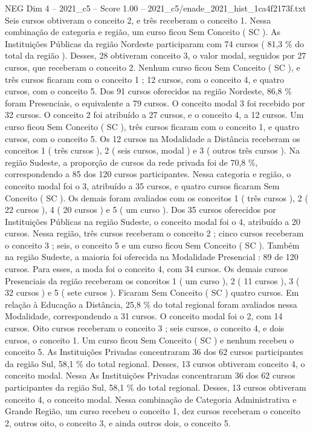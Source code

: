 \begin{textsample}{NEG Dim 4 – 2021\_c5 – Score 1.00 – 2021\_c5/enade\_2021\_hist\_1ca4f2173f.txt}
Seis cursos obtiveram o conceito 2, e três receberam o conceito 1.
Nessa combinação de categoria e região, um curso ficou Sem Conceito ( SC ).
As Instituições Públicas da região Nordeste participaram com 74 cursos ( 81,3 \% do total da região ).
Desses, 28 obtiveram conceito 3, o valor modal, seguidos por 27 cursos, que receberam o conceito 2.
Nenhum curso ficou Sem Conceito ( SC ), e três cursos ficaram com o conceito 1 ; 12 cursos, com o conceito 4, e quatro cursos, com o conceito 5.
Dos 91 cursos oferecidos na região Nordeste, 86,8 \% foram Presenciais, o equivalente a 79 cursos.
O conceito modal 3 foi recebido por 32 cursos.
O conceito 2 foi atribuído a 27 cursos, e o conceito 4, a 12 cursos.
Um curso ficou Sem Conceito ( SC ), três cursos ficaram com o conceito 1, e quatro cursos, com o conceito 5.
Os 12 cursos na Modalidade a Distância receberam os conceitos 1 ( três cursos ), 2 ( seis cursos, modal ) e 3 ( outros três cursos ).
Na região Sudeste, a proporção de cursos da rede privada foi de 70,8 \%, correspondendo a 85 dos 120 cursos participantes.
Nessa categoria e região, o conceito modal foi o 3, atribuído a 35 cursos, e quatro cursos ficaram Sem Conceito ( SC ).
Os demais foram avaliados com os conceitos 1 ( três cursos ), 2 ( 22 cursos ), 4 ( 20 cursos ) e 5 ( um curso ).
Dos 35 cursos oferecidos por Instituições Públicas na região Sudeste, o conceito modal foi o 4, atribuído a 20 cursos.
Nessa região, três cursos receberam o conceito 2 ; cinco cursos receberam o conceito 3 ; seis, o conceito 5 e um curso ficou Sem Conceito ( SC ).
Também na região Sudeste, a maioria foi oferecida na Modalidade Presencial : 89 de 120 cursos.
Para esses, a moda foi o conceito 4, com 34 cursos.
Os demais cursos Presenciais da região receberam os conceitos 1 ( um curso ), 2 ( 11 cursos ), 3 ( 32 cursos ) e 5 ( sete cursos ).
Ficaram Sem Conceito ( SC ) quatro cursos.
Em relação à Educação a Distância, 25,8 \% do total regional foram avaliados nessa Modalidade, correspondendo a 31 cursos.
O conceito modal foi o 2, com 14 cursos.
Oito cursos receberam o conceito 3 ; seis cursos, o conceito 4, e dois cursos, o conceito 1.
Um curso ficou Sem Conceito ( SC ) e nenhum recebeu o conceito 5.
As Instituições Privadas concentraram 36 dos 62 cursos participantes da região Sul, 58,1 \% do total regional.
Desses, 13 cursos obtiveram conceito 4, o conceito modal.
Nessa As Instituições Privadas concentraram 36 dos 62 cursos participantes da região Sul, 58,1 \% do total regional.
Desses, 13 cursos obtiveram conceito 4, o conceito modal.
Nessa combinação de Categoria Administrativa e Grande Região, um curso recebeu o conceito 1, dez cursos receberam o conceito 2, outros oito, o conceito 3, e ainda outros dois, o conceito 5.

\end{textsample}

